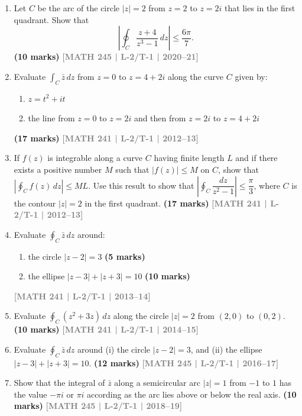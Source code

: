 \documentclass[12pt,a4paper]{article}
\newcommand{\yr}[1]{\hfill\textcolor{gray}{\small\textbf{[#1]}}}
\newcommand{\mk}[1]{\textcolor{orange!70!black}{\small\textbf{(#1 marks)}}}
\begin{document}
\begin{enumerate}

\item Let $C$ be the arc of the circle $|z|=2$ from $z=2$ to $z=2i$ that lies in the first quadrant. Show that
\[
\left|\oint_{C} \frac{z+4}{z^{3}-1}\,dz\right| \leq \frac{6\pi}{7}.
\]
\mk{10} \yr{MATH 245 | L-2/T-1 | 2020--21}

\item Evaluate $\displaystyle\int_{C} \bar{z}\,dz$ from $z=0$ to $z=4+2i$ along the curve $C$ given by:
\begin{enumerate}
  \item $z = t^{2}+it$
  \item the line from $z=0$ to $z=2i$ and then from $z=2i$ to $z=4+2i$
\end{enumerate}
\mk{17} \yr{MATH 241 | L-2/T-1 | 2012--13}

\item If $f(z)$ is integrable along a curve $C$ having finite length $L$ and if there exists a positive number $M$ such that $|f(z)|\le M$ on $C$, show that $\left|\oint_{C}f(z)\,dz\right|\le ML$. Use this result to show that $\left|\oint_{C}\dfrac{dz}{z^{2}-1}\right|\le \dfrac{\pi}{3}$, where $C$ is the contour $|z|=2$ in the first quadrant.
\mk{17} \yr{MATH 241 | L-2/T-1 | 2012--13}

\item Evaluate $\oint_{C}\bar{z}\,dz$ around:
\begin{enumerate}
  \item the circle $|z-2|=3$ \mk{5}
  \item the ellipse $|z-3|+|z+3|=10$ \mk{10}
\end{enumerate}
\yr{MATH 241 | L-2/T-1 | 2013--14}

\item Evaluate $\displaystyle\oint_{C}(z^{2}+3z)\,dz$ along the circle $|z|=2$ from $(2,0)$ to $(0,2)$.
\mk{10} \yr{MATH 241 | L-2/T-1 | 2014--15}

\item Evaluate $\oint_{C}\bar{z}\,dz$ around (i) the circle $|z-2|=3$, and (ii) the ellipse $|z-3|+|z+3|=10$.
\mk{12} \yr{MATH 245 | L-2/T-1 | 2016--17}

\item Show that the integral of $\bar{z}$ along a semicircular arc $|z|=1$ from $-1$ to $1$ has the value $-\pi i$ or $\pi i$ according as the arc lies above or below the real axis.
\mk{10} \yr{MATH 245 | L-2/T-1 | 2018--19}

\end{enumerate}
\end{document}
